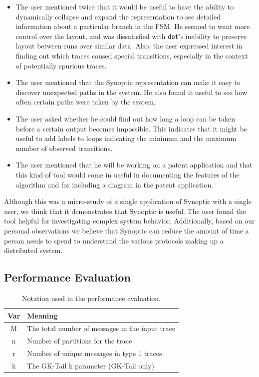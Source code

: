 \begin{itemize}
\item The user mentioned twice that it would be useful to have the
  ability to dynamically collapse and expand the representation to see
  detailed information about a particular branch in the FSM. He seemed to want
  more control over the layout, and was dissatisfied with
  \texttt{dot}'s inability to preserve layout between runs over
  similar data. Also, the user expressed interest in finding out which
  traces caused special transitions, especially in the context of
  potentially spurious traces.

\item The user mentioned that the Synoptic representation can make it
  easy to discover unexpected paths in the system. He also found it
  useful to see how often certain paths were taken by the system.


\item The user asked whether he could find out how long a loop can be
  taken before a certain output becomes impossible. This indicates
  that it might be useful to add labels to loops indicating the
  minimum and the maximum number of observed transitions.

\item The user mentioned that he will be working on a patent
  application and that this kind of tool would come in useful in
  documenting the features of the algorithm and for including a
  diagram in the patent application.

\end{itemize}

Although this was a micro-study of a single application of Synoptic
with a single user, we think that it demonstrates that Synoptic is
useful. The user found the tool helpful for investigating complex
system behavior. Additionally, based on our personal observations we
believe that Synoptic can reduce the amount of time a person needs to
spend to understand the various protocols making up a distributed
system.

\subsection{Performance Evaluation}
\label{subsec:perf_eval}


\begin{table}[!t]
\begin{tabular}{cp{6.7cm}}
  \textbf{Var} & \textbf{Meaning}\\
  \hline
  M & The total number of messages in the input trace\\
  \hline
  n & Number of partitions for the trace\\
  \hline
  r & Number of unique messages in type 1 traces\\
  \hline
  k & The GK-Tail k parameter (GK-Tail only)\\
\end{tabular}
\caption{Notation used in the performance evaluation.}
\label{table:perf_notation}
\end{table}

